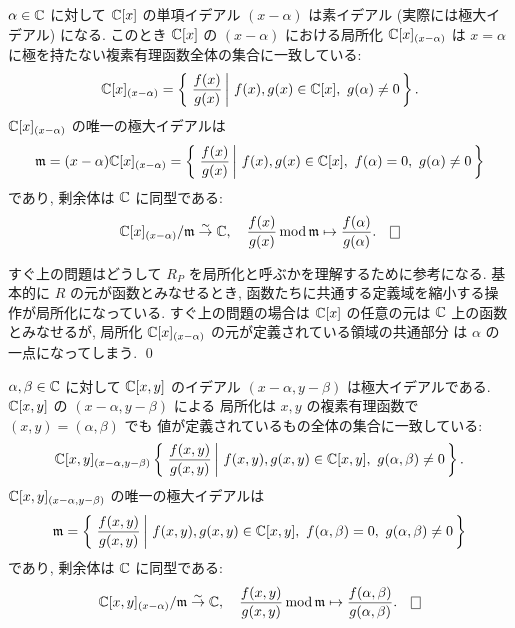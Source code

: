 \documentclass[12pt,twoside]{jarticle}
\begin{document}
\begin{question}
 $\alpha\in{\mathbb C}$ に対して ${\mathbb C}[x]$ の単項イデアル $(x-\alpha)$ は素イデアル
 (実際には極大イデアル) になる. 
 このとき ${\mathbb C}[x]$ の $(x-\alpha)$ における局所化 ${\mathbb C}[x]_{(x-\alpha)}$ は %
 $x=\alpha$ に極を持たない複素有理函数全体の集合に一致している:
 \begin{equation*}
  {\mathbb C}[x]_{(x-\alpha)} =
   \left\{\,\left. \frac{f(x)}{g(x)} 
   \,\right|\, f(x),g(x)\in{\mathbb C}[x],\ g(\alpha)\ne 0 \,\right\}.
 \end{equation*}
 ${\mathbb C}[x]_{(x-\alpha)}$ の唯一の極大イデアルは
 \begin{equation*}
  {\mathfrak m} = (x-\alpha){\mathbb C}[x]_{(x-\alpha)} =
   \left\{\,\left. \frac{f(x)}{g(x)} 
   \,\right|\, f(x),g(x)\in{\mathbb C}[x],\ f(\alpha)=0,\ g(\alpha)\ne 0 \,\right\}
 \end{equation*}
 であり, 剰余体は ${\mathbb C}$ に同型である:
 \begin{equation*}
  \C[x]_{(x-\alpha)}/\frakm \isomto \C, \quad
  \frac{f(x)}{g(x)}\MOD\frakm \mapsto \frac{f(\alpha)}{g(\alpha)}.
  \qed
 \end{equation*}
\end{question}

\begin{guide}
 すぐ上の問題はどうして $R_P$ を局所化と呼ぶかを理解するために参考になる.
 基本的に $R$ の元が函数とみなせるとき, 
 函数たちに共通する定義域を縮小する操作が局所化になっている.
 すぐ上の問題の場合は ${\mathbb C}[x]$ の任意の元は ${\mathbb C}$ 上の函数とみなせるが, 
 局所化 ${\mathbb C}[x]_{(x-\alpha)}$ の元が定義されている領域の共通部分
 は $\alpha$ の一点になってしまう.
 \qed
\end{guide}

\begin{question}
 $\alpha,\beta\in{\mathbb C}$ に対して %
 ${\mathbb C}[x,y]$ のイデアル $(x-\alpha,y-\beta)$ は極大イデアルである.
 ${\mathbb C}[x,y]$ の $(x-\alpha,y-\beta)$ による
 局所化は $x,y$ の複素有理函数で $(x,y)=(\alpha,\beta)$ でも
 値が定義されているもの全体の集合に一致している:
 \begin{equation*}
  {\mathbb C}[x,y]_{(x-\alpha,y-\beta)}
   \left\{\,\left. \frac{f(x,y)}{g(x,y)} 
   \,\right|\, f(x,y),g(x,y)\in{\mathbb C}[x,y],\ g(\alpha,\beta)\ne 0 \,\right\}.
 \end{equation*}
 ${\mathbb C}[x,y]_{(x-\alpha,y-\beta)}$ の唯一の極大イデアルは
 \begin{equation*}
  \frakm =
   \left\{\,\left. \frac{f(x,y)}{g(x,y)} 
   \,\right|\, f(x,y),g(x,y)\in\C[x,y],\ %
   f(\alpha,\beta)=0,\ g(\alpha,\beta)\ne 0 \,\right\}
 \end{equation*}
 であり, 剰余体は ${\mathbb C}$ に同型である:
 \begin{equation*}
  \C[x,y]_{(x-\alpha)}/\frakm \isomto \C, \quad
  \frac{f(x,y)}{g(x,y)}\MOD\frakm
  \mapsto \frac{f(\alpha,\beta)}{g(\alpha,\beta)}.
  \qed
 \end{equation*}
\end{question}
\end{document}
